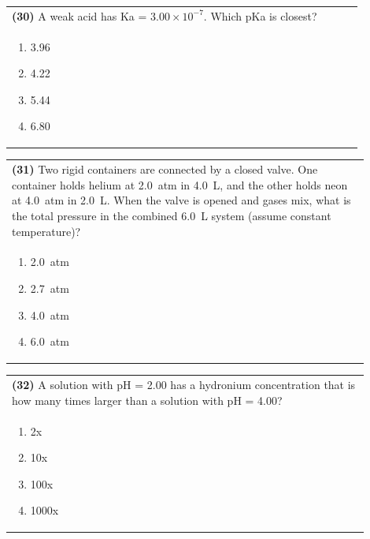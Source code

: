 \documentclass{article}
\begin{document}
\noindent\begin{tabular}{|p{0.9\linewidth}|}
\hline
\textbf{(30)} A weak acid has Ka = $3.00\times10^{-7}$. Which pKa is closest? \\[0.2cm]
\begin{minipage}{0.85\linewidth}
\begin{enumerate}[label=\alph*.]
\item 3.96 \item 4.22 \item 5.44 \item 6.80
\end{enumerate}
\end{minipage}\\[0.2cm]
\hline
\end{tabular}

\noindent\begin{tabular}{|p{0.9\linewidth}|}
\hline
\textbf{(31)} Two rigid containers are connected by a closed valve. One container holds helium at 2.0~atm in 4.0~L, and the other holds neon at 4.0~atm in 2.0~L. When the valve is opened and gases mix, what is the total pressure in the combined 6.0~L system (assume constant temperature)?\\[0.2cm]
\begin{minipage}[t]{0.85\linewidth}
\begin{enumerate}[label=\alph*.]
\item 2.0~atm
\item 2.7~atm
\item 4.0~atm
\item 6.0~atm
\end{enumerate}
\end{minipage}\\[0.2cm]
\hline
\end{tabular}

\noindent\begin{tabular}{|p{0.9\linewidth}|}
\hline
\textbf{(32)} A solution with pH = 2.00 has a hydronium concentration that is how many times larger than a solution with pH = 4.00? \\[0.2cm]
\begin{minipage}{0.85\linewidth}
\begin{enumerate}[label=\alph*.]
\item 2x \item 10x \item 100x \item 1000x
\end{enumerate}
\end{minipage}\\[0.2cm]
\hline
\end{tabular}
\end{document}
